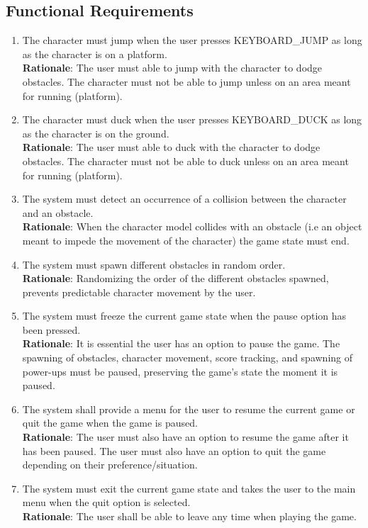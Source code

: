 \documentclass[12pt, titlepage]{article}
\begin{document}
\subsection{Functional Requirements}
\begin{enumerate}
	\item The character must jump when the user presses KEYBOARD\_JUMP as long as the character is on a platform.\\
	\textbf{Rationale}: The user must able to jump with the character to dodge obstacles. The character must not be able to jump unless on an area meant for running (platform).
	\item The character must duck when the user presses KEYBOARD\_DUCK as long as the character is on the ground.\\
	\textbf{Rationale}: The user must able to duck with the character to dodge obstacles. The character must not be able to duck unless on an area meant for running (platform).
	\item The system must detect an occurrence of a collision between the character and an obstacle.\\
	\textbf{Rationale}: When the character model collides with an obstacle (i.e an object meant to impede the movement of the character) the game state must end.
	\item The system must spawn different obstacles in random order.\\
	\textbf{Rationale}: Randomizing the order of the different obstacles spawned, prevents predictable character movement by the user.
	
	\item The system must freeze the current game state when the pause option has been pressed.\\
	\textbf{Rationale}: It is essential the user has an option to pause the game. The spawning of obstacles, character movement, score tracking, and spawning of power-ups must be paused, preserving the game's state the moment it is paused.
	
	\item The system shall provide a menu for the user to resume the current game or quit the game when the game is paused.\\
	\textbf{Rationale}: The user must also have an option to resume the game after it has been paused. The user must also have an option to quit the game depending on their preference/situation. 
	
	\item The system must exit the current game state and takes the user to the main menu when the quit option is selected.\\
	\textbf{Rationale}: The user shall be able to leave any time when playing the game.
	

\end{enumerate}
\end{document}
